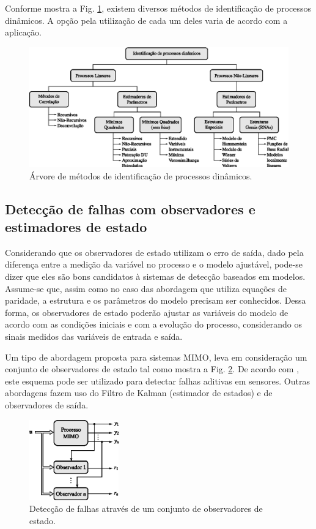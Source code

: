 Conforme mostra a Fig. \ref{fig:metodos_identificacao}, existem diversos métodos
de identificação de processos dinâmicos. A opção pela utilização de cada um
deles varia de acordo com a aplicação.

\begin{figure}[htb]
\centering
    \includegraphics[width=\textwidth]{imgs/detec_diag/eps/metodos_identificacao}
    \caption{Árvore de métodos de identificação de processos dinâmicos.}
    \label{fig:metodos_identificacao}
\end{figure}

\subsection{Detecção de falhas com observadores e estimadores de estado}
Considerando que os observadores de estado utilizam o erro de saída, dado pela
diferença entre a medição da variável no processo e o modelo ajustável, pode-se
dizer que eles são bons candidatos à sistemas de detecção baseados em modelos.
Assume-se que, assim como no caso das abordagem que utiliza equações de
paridade, a estrutura e os parâmetros do modelo precisam ser conhecidos. Dessa
forma, os observadores de estado poderão ajustar as variáveis do modelo de
acordo com as condições iniciais e com a evolução do processo, considerando os
sinais medidos das variáveis de entrada e saída.

Um tipo de abordagem proposta para sistemas MIMO, leva em consideração um
conjunto de observadores de estado tal como mostra a Fig.
\ref{fig:conj_obs_est}. De acordo com , este esquema
pode ser utilizado para detectar falhas aditivas em sensores. Outras abordagens
fazem uso do Filtro de Kalman (estimador de estados) e de observadores de saída. 

\begin{figure}[htb]
\centering
    \includegraphics[width=0.345\textwidth]{imgs/detec_diag/eps/conj_obs_est}
    \caption{Detecção de falhas através de um conjunto de observadores de
             estado.}
    \label{fig:conj_obs_est}
\end{figure}
 
